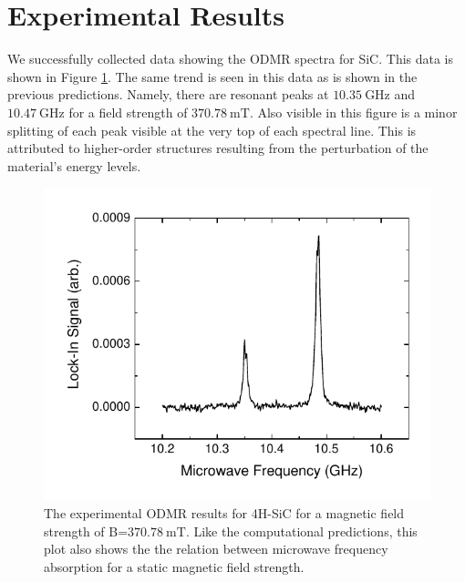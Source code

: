\documentclass[oneside, noacknowlegments]{BYUPhys}
\begin{document}
\section{Experimental Results}

We successfully collected data showing the ODMR spectra for SiC. This data is shown in Figure \ref{fig:SiCResults}. The same trend is seen in this data as is shown in the previous predictions. Namely, there are resonant peaks at $10.35~\text{GHz}$ and $10.47~\text{GHz}$ for a field strength of $370.78~\text{mT}$. Also visible in this figure is a minor splitting of each peak visible at the very top of each spectral line. This is attributed to higher-order structures resulting from the perturbation of the material's energy levels.

\begin{figure}[H]
    \centerline{\includegraphics{p14-odmr}}
    \caption[Experimental ODMR for SiC]{\label{fig:SiCResults}
     The experimental ODMR results for 4H-SiC for a magnetic field strength of B=$370.78~\text{mT}$. Like the computational predictions, this plot also shows the the relation between microwave frequency absorption for a static magnetic field strength.}
 \end{figure}
 
\end{document}
